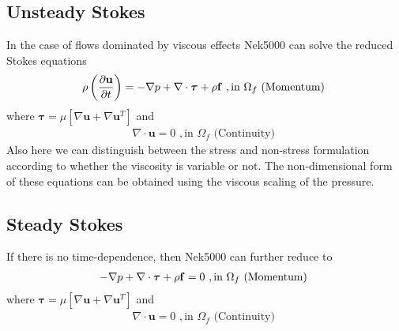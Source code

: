 \documentclass[letterpaper,10pt,english]{sphinxmanual}
\begin{document}
\subsection{Unsteady Stokes}
\label{\detokenize{theory:intro-ns-stokes}}\label{\detokenize{theory:unsteady-stokes}}
In the case of flows dominated by viscous effects Nek5000 can solve the reduced Stokes equations
\begin{equation}\label{equation:theory:ns_momentum_stokes}
\begin{split}\rho\left(\frac{\partial \mathbf u}{\partial t} \right) = - \nabla p + \nabla \cdot \boldsymbol\tau + \rho {\bf f} \,\, , \text{in } \Omega_f \text{  (Momentum)  }\end{split}
\end{equation}
where \(\boldsymbol\tau=\mu[\nabla \mathbf u+\nabla \mathbf u^{T}]\) and
\begin{equation}\label{equation:theory:ns_cont_stokes}
\begin{split}\nabla \cdot \mathbf u =0 \,\, , \text{in } \Omega_f  \text{  (Continuity)  }\end{split}
\end{equation}
Also here we can distinguish between the stress and non-stress formulation according to whether the
viscosity is variable or not. The non-dimensional form of these equations can be obtained using the
viscous scaling of the pressure.


\subsection{Steady Stokes}
\label{\detokenize{theory:steady-stokes}}\label{\detokenize{theory:intro-ns-steady-stokes}}
If there is no time-dependence, then Nek5000 can further reduce to
\begin{equation}\label{equation:theory:ns_momentum_steady_stokes}
\begin{split}- \nabla p + \nabla \cdot \boldsymbol\tau + \rho {\bf f}=0 \,\, , \text{in } \Omega_f \text{  (Momentum)  }\end{split}
\end{equation}
where \(\boldsymbol\tau=\mu[\nabla \mathbf u+\nabla {\mathbf u}^{T}]\) and
\begin{equation}\label{equation:theory:ns_cont_steady_stokes}
\begin{split}\nabla \cdot \mathbf u =0 \,\, , \text{in } \Omega_f  \text{  (Continuity)  }\end{split}
\end{equation}
\end{document}
